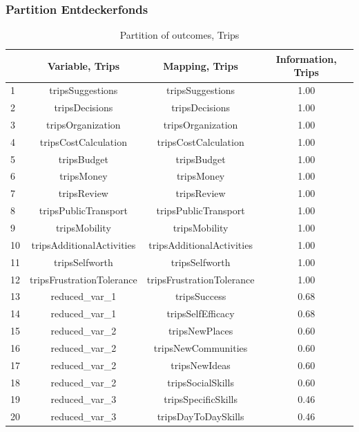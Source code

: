 \begin{frame}
\frametitle{Partition Entdeckerfonds}
\begin{table}[ht]
\centering
\begin{tabular}{lccc}
  \hline
 & Variable, Trips & Mapping, Trips & Information, Trips \\ 
  \hline
1 & tripsSuggestions & tripsSuggestions & 1.00 \\ 
  2 & tripsDecisions & tripsDecisions & 1.00 \\ 
  3 & tripsOrganization & tripsOrganization & 1.00 \\ 
  4 & tripsCostCalculation & tripsCostCalculation & 1.00 \\ 
  5 & tripsBudget & tripsBudget & 1.00 \\ 
  6 & tripsMoney & tripsMoney & 1.00 \\ 
  7 & tripsReview & tripsReview & 1.00 \\ 
  8 & tripsPublicTransport & tripsPublicTransport & 1.00 \\ 
  9 & tripsMobility & tripsMobility & 1.00 \\ 
  10 & tripsAdditionalActivities & tripsAdditionalActivities & 1.00 \\ 
  11 & tripsSelfworth & tripsSelfworth & 1.00 \\ 
  12 & tripsFrustrationTolerance & tripsFrustrationTolerance & 1.00 \\ 
  13 & reduced\_var\_1 & tripsSuccess & 0.68 \\ 
  14 & reduced\_var\_1 & tripsSelfEfficacy & 0.68 \\ 
  15 & reduced\_var\_2 & tripsNewPlaces & 0.60 \\ 
  16 & reduced\_var\_2 & tripsNewCommunities & 0.60 \\ 
  17 & reduced\_var\_2 & tripsNewIdeas & 0.60 \\ 
  18 & reduced\_var\_2 & tripsSocialSkills & 0.60 \\ 
  19 & reduced\_var\_3 & tripsSpecificSkills & 0.46 \\ 
  20 & reduced\_var\_3 & tripsDayToDaySkills & 0.46 \\ 
   \hline
\end{tabular}
\caption{Partition of outcomes, Trips} 
\label{partitiontrips}
\end{table}

\end{frame}



